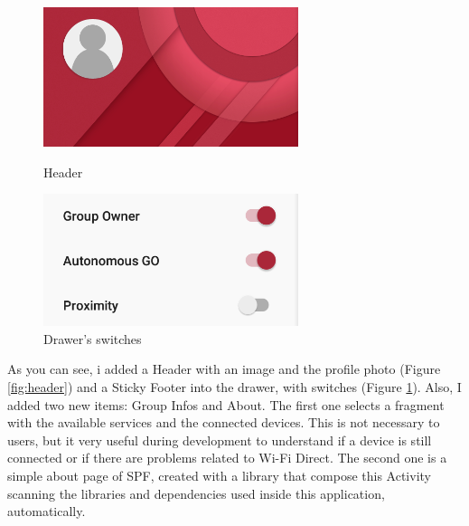 \begin{figure}[thpb]
\centering
\begin{minipage}[b]{0.4\textwidth}
	\centering
	\includegraphics[width=\textwidth]{./images/chap3/header.png}
	\caption{Header}
	\label{fig:header}
\end{minipage}
\hfill
\begin{minipage}[b]{0.4\textwidth}
	\centering
	\includegraphics[width=\textwidth]{./images/chap3/switches.png}
	\caption{Drawer's switches}
	\label{fig:switches}
\end{minipage}	
\end{figure}



As you can see, i added a Header with an image and the profile photo (Figure \ref{fig:header}) and a Sticky Footer into the drawer, with switches (Figure \ref{fig:switches}). Also, I added two new items: Group Infos and About. The first one selects a fragment with the available services and the connected devices. This is not necessary to users, but it very useful during development to understand if a device is still connected or if there are problems related to Wi-Fi Direct. The second one is a simple about page of SPF, created with a library that compose this Activity scanning the libraries and dependencies used inside this application, automatically.

